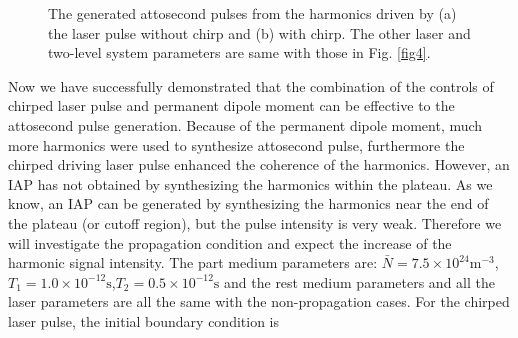 \documentclass[10pt,letterpaper]{article}
\begin{document}
\begin{figure}[!htbp]
	\centering
	\caption{The generated attosecond pulses from the harmonics driven by (a) the laser pulse without chirp and (b) with chirp. The other laser and two-level system parameters are same with those in Fig. \ref{fig4}.}
	\label{fig5}
\end{figure}	

Now we have successfully demonstrated that the combination of the controls of chirped laser pulse and permanent dipole moment can be effective to the attosecond pulse generation. Because of the permanent dipole moment, much more harmonics were used to synthesize attosecond pulse, furthermore the chirped driving laser pulse enhanced the coherence of the harmonics. However, an IAP has not obtained by synthesizing the harmonics within the plateau. As we know, an IAP can be generated by synthesizing the harmonics near the end of the plateau (or cutoff region), but the pulse intensity is very weak. Therefore we will investigate the propagation condition and expect the increase of the harmonic signal intensity. The part medium parameters are: $ \bar{N}=7.5\times10^{24} \textrm{m}^{-3}$, $ T_{1}=1.0\times10^{-12} \textrm{s} $,$ T_{2}=0.5\times10^{-12} \textrm{s} $ \cite{Kalosha-Two-Level-PRL-1999} and the rest medium parameters and all the laser parameters are all the same with the non-propagation cases. For the chirped laser pulse, the initial boundary condition is
\end{document}
